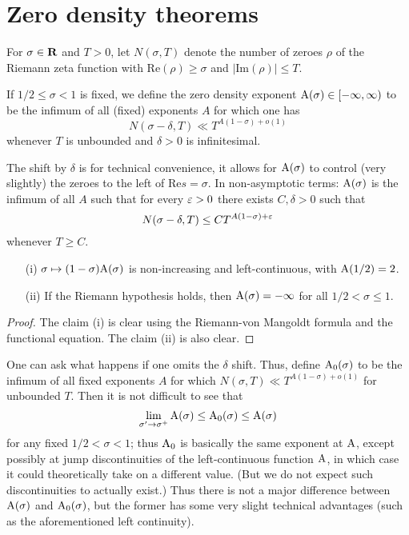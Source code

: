 \chapter{Zero density theorems}

\begin{definition}\label{zero-def}  For $\sigma \in \mathbf{R}$ and $T>0$, let $N(\sigma,T)$ denote the number of zeroes $\rho$ of the Riemann zeta function with $\mathrm{Re}(\rho) \geq \sigma$ and $|\mathrm{Im}(\rho)| \leq T$.

If $1/2 \leq \sigma < 1$ is fixed, we define the zero density exponent $\mathrm{A}(\sigma) \in [-\infty,\infty)$ to be the infimum of all (fixed) exponents $A$ for which one has
    $$ N(\sigma-\delta,T) \ll T^{A (1-\sigma)+o(1)}$$
whenever $T$ is unbounded and $\delta>0$ is infinitesimal.
\end{definition}

The shift by $\delta$ is for technical convenience, it allows for $\mathrm{A}(\sigma)$ to control (very slightly) the zeroes to the left of $\mathrm{Re} s = \sigma$.  In non-asymptotic terms: $\mathrm{A}(\sigma)$ is the infimum of all $A$ such that for every $\varepsilon>0$ there exists $C, \delta > 0$ such that
$$ N(\sigma-\delta, T) \leq C T^{A(1-\sigma)+\varepsilon}$$
whenever $T \geq C$.

\begin{lemma}\label{zero-basic}
\begin{itemize}
\item[(i)] $\sigma \mapsto (1-\sigma) \mathrm{A}(\sigma)$ is non-increasing and left-continuous, with $\mathrm{A}(1/2)=2$.
\item[(ii)] If the Riemann hypothesis holds, then $\mathrm{A}(\sigma)=-\infty$ for all $1/2 < \sigma \leq 1$.
\end{itemize}
\end{lemma}

\begin{proof} The claim (i) is clear using the Riemann-von Mangoldt formula \cite[Theorem 1.7]{ivic} and the functional equation.  The claim (ii) is also clear.
\end{proof}

\begin{remark} One can ask what happens if one omits the $\delta$ shift.  Thus, define $\mathrm{A}_0(\sigma)$ to be the infimum of all fixed exponents $A$ for which  $N(\sigma,T) \ll T^{A (1-\sigma)+o(1)}$ for unbounded $T$. Then it is not difficult to see that
$$ \lim_{\sigma' \to \sigma^+} \mathrm{A}(\sigma) \leq \mathrm{A}_0(\sigma) \leq \mathrm{A}(\sigma)$$
for any fixed $1/2 < \sigma < 1$; thus $\mathrm{A}_0$ is basically the same exponent at $\mathrm{A}$, except possibly at jump discontinuities of the left-continuous function $\mathrm{A}$, in which case it could theoretically take on a different value.  (But we do not expect such discontinuities to actually exist.)  Thus there is not a major difference between $\mathrm{A}(\sigma)$ and $\mathrm{A}_0(\sigma)$, but the former has some very slight technical advantages (such as the aforementioned left continuity).
\end{remark}

